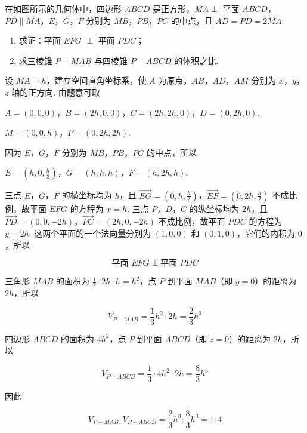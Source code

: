 \begin{problem}
在如图所示的几何体中，四边形 \(ABCD\) 是正方形，\(MA \perp\) 平面 \(ABCD\)，\(PD \parallel MA\)，\(E\)，\(G\)，\(F\) 分别为 \(MB\)，\(PB\)，\(PC\) 的中点，且 \(AD = PD = 2MA\).

\begin{enumerate}
\item 求证：平面 \(EFG\) \(\perp\) 平面 \(PDC\)；
\item 求三棱锥 \(P - MAB\) 与四棱锥 \(P - ABCD\) 的体积之比.
\end{enumerate}

\end{problem}

\begin{solution}
设 \(MA=h\)，建立空间直角坐标系，使 \(A\) 为原点，\(AB\)，\(AD\)，\(AM\) 分别为 \(x\)，\(y\)，\(z\) 轴的正方向. 由题意可取

\(A=(0,0,0)\)，\(B=(2h,0,0)\)，\(C=(2h,2h,0)\)，\(D=(0,2h,0)\).

\(M=(0,0,h)\)，\(P=(0,2h,2h)\).

因为 \(E\)，\(G\)，\(F\) 分别为 \(MB\)，\(PB\)，\(PC\) 的中点，所以

\(E=\left(h,0,\frac{h}{2}\right)\)，\(G=(h,h,h)\)，\(F=(h,2h,h)\).

三点 \(E\)，\(G\)，\(F\) 的横坐标均为 \(h\)，且 \(\overrightarrow{EG}=(0,h,\frac{h}{2})\)，\(\overrightarrow{EF}=(0,2h,\frac{h}{2})\) 不成比例，故平面 \(EFG\) 的方程为 \(x=h\). 三点 \(P\)，\(D\)，\(C\) 的纵坐标均为 \(2h\)，且 \(\overrightarrow{PD}=(0,0,-2h)\)，\(\overrightarrow{PC}=(2h,0,-2h)\) 不成比例，故平面 \(PDC\) 的方程为 \(y=2h\). 这两个平面的一个法向量分别为 \((1,0,0)\) 和 \((0,1,0)\)，它们的内积为 \(0\)，所以

\[
\text{平面 }EFG\perp\text{平面 }PDC
\]

三角形 \(MAB\) 的面积为 \(\frac{1}{2}\cdot 2h\cdot h=h^2\)，点 \(P\) 到平面 \(MAB\)（即 \(y=0\)）的距离为 \(2h\)，所以

\[
V_{P-MAB}=\frac{1}{3}h^2\cdot 2h=\frac{2}{3}h^3
\]

四边形 \(ABCD\) 的面积为 \(4h^2\)，点 \(P\) 到平面 \(ABCD\)（即 \(z=0\)）的距离为 \(2h\)，所以

\[
V_{P-ABCD}=\frac{1}{3}\cdot 4h^2\cdot 2h=\frac{8}{3}h^3
\]

因此

\[
V_{P-MAB}:V_{P-ABCD}=\frac{2}{3}h^3:\frac{8}{3}h^3=1:4
\]
\end{solution}


